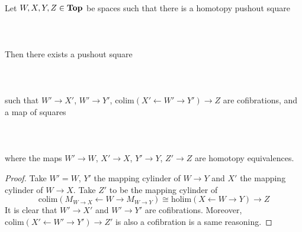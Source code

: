 \documentclass[a4paper]{article}
\begin{document}
\begin{prp}{}{}\\
Let $W,X,Y,Z\in\bold{Top}$ be spaces such that there is a homotopy pushout square  
 \\~\\  \\~\\
Then there exists a pushout square  
 \\~\\  \\~\\
such that $W'\to X'$, $W'\to Y'$, $\text{colim}(X'\leftarrow W'\rightarrow Y')\to Z$ are cofibrations, and a map of squares  
 \\~\\  \\~\\
where the maps $W'\to W$, $X'\to X$, $Y'\to Y$, $Z'\to Z$ are homotopy equivalences. 
\begin{proof}
Take $W'=W$, $Y'$ the mapping cylinder of $W\to Y$ and $X'$ the mapping cylinder of $W\to X$. Take $Z'$ to be the mapping cylinder of $$\text{colim}(M_{W\to X}\leftarrow W\rightarrow M_{W\to Y})\cong\text{holim}(X\leftarrow W\rightarrow Y)\to Z$$ It is clear that $W'\to X'$ and $W'\to Y'$ are cofibrations. Moreover, $\text{colim}(X'\leftarrow W'\rightarrow Y')\to Z'$ is also a cofibration is a same reasoning. 
\end{proof}
\end{prp}
\end{document}
